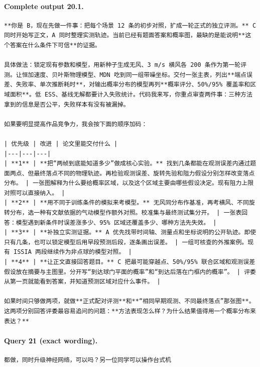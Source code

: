 \documentclass[UTF8,10pt]{ctexart}
\begin{document}
\paragraph{Complete output 20.1.}
\begin{Verbatim}[breaklines=true,breakanywhere=true,fontsize=\scriptsize,frame=single,framesep=2pt]
**你是 B，现在先做一件事：把每个场景 12 条的初步对照，扩成一轮正式的独立评测。** C 同时开始写正文，A 同时整理实测轨迹。当前已经有题面答案和概率图，最缺的是能说明**这个答案在什么条件下可信**的证据。

具体做法：锁定现有参数和模型，用新种子生成无风、3 m/s 横风各 200 条作为第一轮评测。让恒加速度、贝叶斯物理模型、MDN 吃到同一组带噪坐标。交付一张主表，列出**端点误差、失败率、单次推断耗时**，对输出概率分布的模型再列**概率评分、50%/95% 覆盖率和区域面积**。低 ESS、基线无解都要计入失败统计。代码我来写，你重点审查两件事：三种方法拿到的信息是否公平，失败样本有没有被漏掉。

如果要明显提高作品竞争力，我会按下面的顺序加码：

| 优先级 | 改进 | 论文里能交付什么 |
|---|---|---|
| **1** | **把“两帧到底能知道多少”做成核心实验。** 找到几条都能在观测误差内通过题面两点、但最终落点不同的物理轨迹。再检验观测误差、旋转先验和阻力假设分别怎样改变落点分布。 | 一张图解释为什么要给概率区域，以及这个区域主要由哪些假设决定。现有阻力上限对照可以直接纳入。 |
| **2** | **用不同于训练条件的模拟来考模型。** 无风同分布作基准，再考横风、不同旋转分布，选一种有文献依据的气动模型作额外对照。校准集与最终测试集分开。 | 一张表回答：模型遇到新条件时误差涨多少、95% 区域还覆盖多少、哪种方法先失效。 |
| **3** | **补独立实测证据。** A 优先找带时间轴、测量点和坐标说明的公开轨迹。即使只有几条，也可以锁定模型后用早段预测后段，逐条画出误差。 | 一组可核查的外推案例。现有 ISSIA 两段继续作为非点球的模型对照。 |
| **4** | **让正文直接回答题目。** C 把最可能穿越点、50%/95% 联合区域和观测误差假设放在摘要与主图里。分开写“到达球门平面的概率”和“到达后落在门框内的概率”。 | 评委从第一页就能看到答案，并知道预测区域对应什么事件。 |

如果时间只够做两项，就做**正式配对评测**和**“相同早期观测、不同最终落点”那张图**。这两项分别回答评委最容易追问的问题：**方法表现怎么样？为什么结果值得用一个概率分布来表达？**
\end{Verbatim}

\paragraph{Query 21 (exact wording).}
\begin{Verbatim}[breaklines=true,breakanywhere=true,fontsize=\scriptsize,frame=single,framesep=2pt]
都做，同时升级神经网络，可以吗？另一位同学可以操作台式机
\end{Verbatim}
\end{document}
